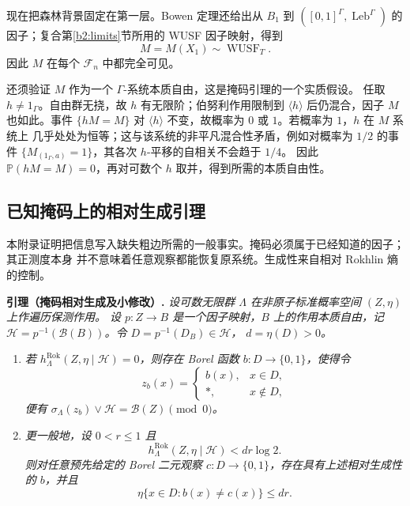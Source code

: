\documentclass[UTF8,zihao=-4,a4paper]{ctexart}
\numberwithin{equation}{section}
\newcommand{\PP}{\mathbb P}
\begin{document}
现在把森林背景固定在第一层。Bowen 定理还给出从 $B_1$ 到
$([0,1]^\Gamma,\operatorname{Leb}^\Gamma)$ 的因子；复合第\ref{b2:limits}节所用的
WUSF 因子映射，得到
\begin{equation}\label{b2:background}
 M=M(X_1)\sim\operatorname{WUSF}_T.
\end{equation}
因此 $M$ 在每个 $\mathcal F_n$ 中都完全可见。

还须验证 $M$ 作为一个 $\Gamma$-系统本质自由，这是掩码引理的一个实质假设。
任取 $h\ne1_\Gamma$。自由群无挠，故 $h$ 有无限阶；伯努利作用限制到
$\langle h\rangle$ 后仍混合，因子 $M$ 也如此。事件 $\{hM=M\}$ 对
$\langle h\rangle$ 不变，故概率为 $0$ 或 $1$。若概率为 $1$，$h$ 在 $M$ 系统上
几乎处处为恒等；这与该系统的非平凡混合性矛盾，例如对概率为 $1/2$ 的事件
$\{M_{(1_\Gamma,a)}=1\}$，其各次 $h$-平移的自相关不会趋于 $1/4$。
因此 $\PP(hM=M)=0$，再对可数个 $h$ 取并，得到所需的本质自由性。

\subsection{已知掩码上的相对生成引理}\label{b2:mask}

本附录证明把信息写入缺失粗边所需的一般事实。掩码必须属于已经知道的因子；其正测度本身
并不意味着任意观察都能恢复原系统。生成性来自相对 Rokhlin 熵的控制。

\medskip
\noindent\textbf{引理（掩码相对生成及小修改）.}
\emph{设可数无限群 $\Lambda$ 在非原子标准概率空间 $(Z,\eta)$ 上作遍历保测作用。
设 $p:Z\to B$ 是一个因子映射，$B$ 上的作用本质自由，记
$\mathcal H=p^{-1}(\mathcal B(B))$。令 $D=p^{-1}(D_B)\in\mathcal H$，
$d=\eta(D)>0$。}
\begin{enumerate}
 \item \emph{若 $h^{\mathrm{Rok}}_\Lambda(Z,\eta\mid\mathcal H)=0$，则存在 Borel
 函数 $b:D\to\{0,1\}$，使得令}
 \begin{equation}\label{b2:maskedname}
 z_b(x)=\begin{cases}b(x),&x\in D,\\ *,&x\notin D,\end{cases}
 \end{equation}
 \emph{便有 $\sigma_\Lambda(z_b)\vee\mathcal H=\mathcal B(Z)\pmod0$。}
 \item \emph{更一般地，设 $0<r\le1$ 且}
 \begin{equation}\label{b2:maskassumption}
 h^{\mathrm{Rok}}_\Lambda(Z,\eta\mid\mathcal H)<dr\log2.
 \end{equation}
 \emph{则对任意预先给定的 Borel 二元观察 $c:D\to\{0,1\}$，存在具有上述相对生成性的
 $b$，并且}
 \begin{equation}\label{b2:maskerror}
 \eta\{x\in D:b(x)\ne c(x)\}\le dr.
 \end{equation}
\end{enumerate}
\end{document}
